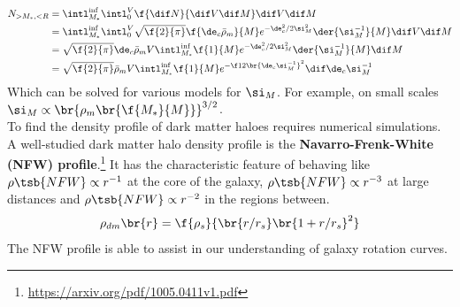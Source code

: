 \documentclass{article}
\begin{document}
\begin{align*}
N_{> M_{*}, < R}
&= \intl_{M_{*}}^{\inf}\intl_{0}^{V} \f{\dif N}{\dif V \dif M} \dif V \dif M \\
&= \intl_{M_{*}}^{\inf}\intl_{0}^{V} \sqrt{\f{2}{\pi}}\f{\de_c\bar \rho_m}{M} e^{-{\de_c^2}/{2 \si_M^2}} \der{\si_M^{-1}}{M} \dif V \dif M \\
&= \sqrt{\f{2}{\pi}}\de_c\bar \rho_m V \intl_{M_{*}}^{\inf} \f{1}{M} e^{-{\de_c^2}/{2 \si_M^2}} \der{\si_M^{-1}}{M} \dif M \\
&= \sqrt{\f{2}{\pi}}\bar \rho_m V \intl_{M_{*}}^{\inf} \f{1}{M} e^{-\f12\br{\de_c \si_M^{-1}}^2 } \dif \de_c\si_M^{-1}
\end{align*}
Which can be solved for various models for $\si_M$. For example, on small scales $\si_M \propto \br{\rho_m\br{\f{M_{*}}{M}}}^{3/2}$. \\

To find the density profile of dark matter haloes requires numerical simulations. A well-studied dark matter halo density profile is the \textbf{Navarro-Frenk-White (NFW) profile}.\footnote{\url{https://arxiv.org/pdf/1005.0411v1.pdf}} It has the characteristic feature of behaving like $\rho\tsb{NFW} \propto r^{-1}$ at the core of the galaxy, $\rho\tsb{NFW} \propto r^{-3}$ at large distances and $\rho\tsb{NFW} \propto r^{-2}$ in the regions between.
\[ \rho_{dm}\br{r} = \f{\rho_s}{\br{r/r_s} \br{1 + r/r_s}^2} \]
The NFW profile is able to assist in our understanding of galaxy rotation curves.\\
\end{document}
